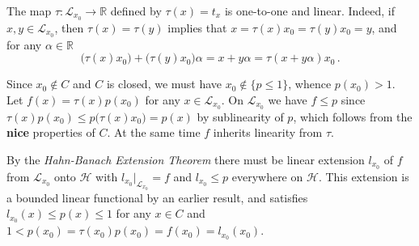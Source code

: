 \documentclass[a4paper]{article}
\newcommand{\Hcal}{\mathcal{H}}
\newcommand{\real}{\mathbb{R}}
\newcommand{\Lcal}{\mathcal{L}}
\begin{document}
The map $\tau\colon \Lcal_{x_0} \to \real$ defined by $\tau(x) = t_x$ is one-to-one
and linear. Indeed, if $x, y\in \Lcal_{x_0}$, then $\tau(x) = \tau(y)$ implies that
$x = \tau(x) x_0 = \tau(y) x_0 = y$, and for any $\alpha\in \real$
\begin{equation}
  \bigl( \tau(x) x_0 \bigr) + \bigl( \tau(y) x_0 \bigr) \alpha
    = x + y \alpha
    = \tau(x + y \alpha) x_0
  \,.
\end{equation}

Since $x_0 \notin C$ and $C$ is closed, we must have $x_0\notin \{p\leq 1\}$, whence
$p(x_0) > 1$. Let $f(x) = \tau(x) p(x_0)$ for any $x \in \Lcal_{x_0}$. On $\Lcal_{x_0}$
we have $f\leq p$ since $\tau(x) p(x_0) \leq p\bigl(\tau(x) x_0\bigr) = p(x)$ by
sublinearity of $p$, which follows from the {\bf nice} properties of $C$. At the same
time $f$ inherits linearity from $\tau$.

By the {\it Hahn-Banach Extension Theorem} there must be linear extension $l_{x_0}$
of $f$ from $\Lcal_{x_0}$ onto $\Hcal$ with $l_{x_0}\big\vert_{\Lcal_{x_0}} = f$ and
$l_{x_0} \leq p$ everywhere on $\Hcal$. This extension is a bounded linear functional
by an earlier result, and satisfies $l_{x_0}(x) \leq p(x) \leq 1$ for any $x\in C$
and $1 < p(x_0) = \tau(x_0) p(x_0) = f(x_0) = l_{x_0}(x_0)$.

\end{document}
